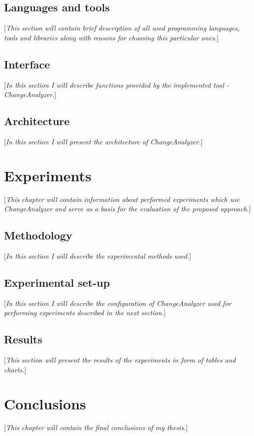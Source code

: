 \documentclass{pracamgr}
\begin{document}
\section{Languages and tools}
\label{sec:languagess}
[\textit{This section will contain brief description of all used programming languages, tools and libraries along with reasons for choosing this particular ones.}]

\section{Interface}
\label{sec:interface}
[\textit{In this section I will describe functions provided by the implemented tool - ChangeAnalyzer.}]

\section{Architecture}
\label{sec:architecture}
[\textit{In this section I will present the architecture of ChangeAnalyzer.}]

\chapter{Experiments}
\label{cha:experiments}
[\textit{This chapter will contain information about performed experiments which use ChangeAnalyzer and serve as a basis for the evaluation of the proposed approach.}]

\section{Methodology}
\label{sec:methodology}
[\textit{In this section I will describe the experimental methods used.}]

\section{Experimental set-up}
\label{sec:set-up}
[\textit{In this section I will describe the configuration of ChangeAnalyzer used for performing experiments described in the next section.}]

\section{Results}
\label{sec:results}
[\textit{This section will present the results of the experiments in form of tables and charts.}]

\chapter{Conclusions}
\label{cha:conclusions}
[\textit{This chapter will contain the final conclusions of my thesis.}]
\end{document}
